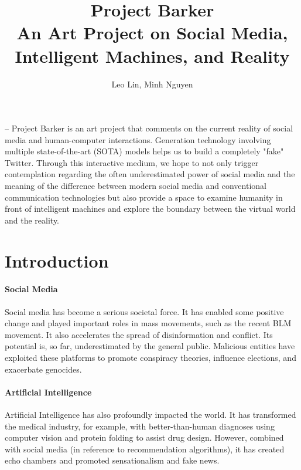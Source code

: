 \documentclass[12pt, letterpaper]{article}
\begin{document}
\title{%
\huge \textbf{Project Barker}\\
\large An Art Project on Social Media, Intelligent Machines, and Reality}

\author{Leo Lin, Minh Nguyen}

\maketitle

\newpage
\abstractname{ -- Project Barker is an art project that comments on the current reality of social media and human-computer interactions. Generation technology involving multiple state-of-the-art (SOTA) models helps us to build a completely "fake" Twitter. Through this interactive medium, we hope to not only trigger contemplation regarding the often underestimated power of social media and the meaning of the difference between modern social media and conventional communication technologies but also provide a space to examine humanity in front of intelligent machines and explore the boundary between the virtual world and the reality.}

\section{Introduction}

\paragraph{Social Media}Social media has become a serious societal force. It has enabled some positive change and played important roles in mass movements, such as the recent BLM movement. It also accelerates the spread of disinformation and conflict. Its potential is, so far, underestimated by the general public. Malicious entities have exploited these platforms to promote conspiracy theories, influence elections, and exacerbate genocides.

\paragraph{Artificial Intelligence}Artificial Intelligence has also profoundly impacted the world. It has transformed the medical industry, for example, with better-than-human diagnoses using computer vision and protein folding to assist drug design. However, combined with social media (in reference to recommendation algorithms), it has created echo chambers and promoted sensationalism and fake news.
\end{document}
